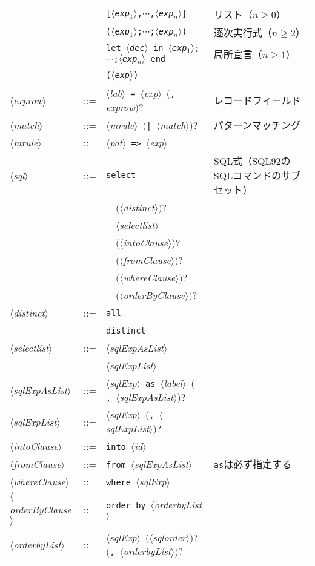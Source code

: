 \documentclass{jbook}
\newcommand{\vbar}{\mbox{\ $|$\ }}
\newcommand{\nonterm}[1]{\mbox{$\langle$}{\it #1}\mbox{$\rangle$}}
\newcommand{\term}[1]{\mbox{{\tt #1}}}
\newcommand{\optional}[1]{\mbox{$($}{\protect #1}\mbox{$)?$}}
\newcommand{\myem}{\mbox{\ \ }}
\begin{document}
\begin{center}
\begin{tabular}{lcll}
&\vbar&\term{[\nonterm{exp$_1$},$\cdots$,\nonterm{exp$_n$}]}& リスト（$n\ge 0$）\\
&\vbar&\term{(\nonterm{exp$_1$};$\cdots$;\nonterm{exp$_n$})}& 逐次実行式（$n\ge 2$）\\
&\vbar&\term{let \nonterm{dec} in \nonterm{exp$_1$};$\cdots$;\nonterm{exp$_n$} end}& 局所宣言（$n\ge 1$）\\
&\vbar&\term{(\nonterm{exp})}& \\
\nonterm{exprow}&::=& 
       \nonterm{lab}\ \term{=}\ \nonterm{exp}\ \optional{\term{,} {\it exprow}} & レコードフィールド\\
\nonterm{match} &::=& 
       \nonterm{mrule}\ \optional{\term{|}\ \nonterm{match}} & パターンマッチング\\
\nonterm{mrule} &::=& 
       \nonterm{pat}\ \term{=>}\ \nonterm{exp} & \\
\nonterm{sql} &::=& \term{select} &  SQL式（SQL92のSQLコマンドのサブセット）\\
&&	\myem\optional{\nonterm{distinct}}\\
&&	\myem\nonterm{selectlist}\\
&&	\myem\optional{\nonterm{intoClause}}\\
&&	\myem\optional{\nonterm{fromClause}}\\
&&	\myem\optional{\nonterm{whereClause}}\\
&&	\myem\optional{\nonterm{orderByClause}} &\\
\nonterm{distinct} &::=& \term{all} &\\
                  &\vbar& \term{distinct} &\\
\nonterm{selectlist} &::=& \nonterm{sqlExpAsList}\\
                    &\vbar& \nonterm{sqlExpList}\\
\nonterm{sqlExpAsList} &::=& \nonterm{sqlExp}\ \term{as}\ \nonterm{label}\
	\optional{\term{,}\ \nonterm{sqlExpAsList}}\\
\nonterm{sqlExpList} &::=& \nonterm{sqlExp}\ \optional{\term{,}\ \nonterm{sqlExpList}}&\\
\nonterm{intoClause} &::=& \term{into}\ \nonterm{id}  & \\
\nonterm{fromClause} &::=& \term{from}\ \nonterm{sqlExpAsList}  &\term{as}は必ず指定する\\
\nonterm{whereClause} &::=& \term{where}\ \nonterm{sqlExp}\\
\nonterm{orderByClause} &::=& \term{order by}\ \nonterm{orderbyList}\\
\nonterm{orderbyList} &::=& \nonterm{sqlExp}\ \optional{\nonterm{sqlorder}}\ \optional{\term{,}\ \nonterm{orderbyList}}\\

\end{tabular}
\end{center}
\end{document}
